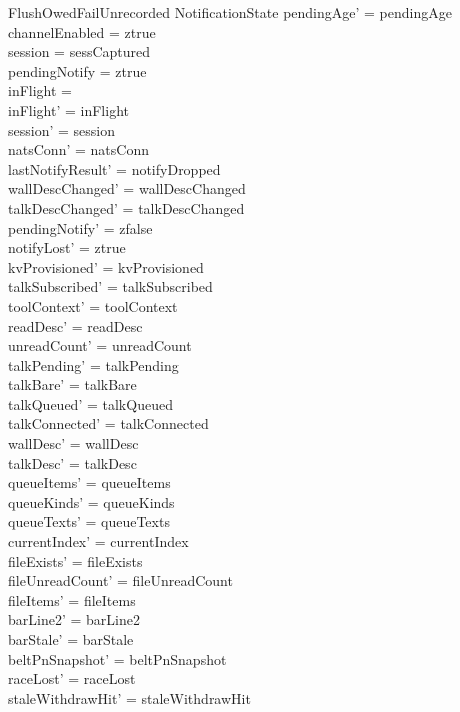 \documentclass[a4paper,10pt,fleqn]{article}
\begin{document}
\begin{schema}{FlushOwedFailUnrecorded}
  \Delta NotificationState
  \where
  pendingAge' = pendingAge \\
  channelEnabled = ztrue \\
  session = sessCaptured \\
  pendingNotify = ztrue \\
  inFlight = \emptyset \\
  inFlight' = inFlight \\
  session' = session \\
  natsConn' = natsConn \\
  lastNotifyResult' = notifyDropped \\
  wallDescChanged' = wallDescChanged \\
  talkDescChanged' = talkDescChanged \\
  pendingNotify' = zfalse \\
  notifyLost' = ztrue \\
  kvProvisioned' = kvProvisioned \\
  talkSubscribed' = talkSubscribed \\
  toolContext' = toolContext \\
  readDesc' = readDesc \\
  unreadCount' = unreadCount \\
  talkPending' = talkPending \\
  talkBare' = talkBare \\
  talkQueued' = talkQueued \\
  talkConnected' = talkConnected \\
  wallDesc' = wallDesc \\
  talkDesc' = talkDesc \\
  queueItems' = queueItems \\
  queueKinds' = queueKinds \\
  queueTexts' = queueTexts \\
  currentIndex' = currentIndex \\
  fileExists' = fileExists \\
  fileUnreadCount' = fileUnreadCount \\
  fileItems' = fileItems \\
  barLine2' = barLine2 \\
  barStale' = barStale \\
  beltPnSnapshot' = beltPnSnapshot \\
  raceLost' = raceLost \\
  staleWithdrawHit' = staleWithdrawHit \\

\end{schema}
\end{document}
